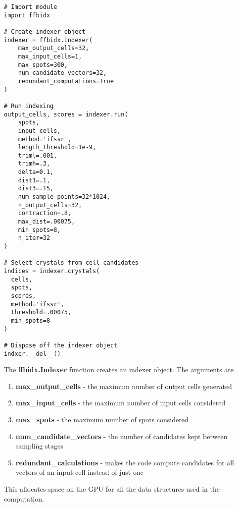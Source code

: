 \documentclass[a4paper,10pt]{article}
\begin{document}
\begin{lstlisting}
# Import module
import ffbidx

# Create indexer object
indexer = ffbidx.Indexer(
    max_output_cells=32,
    max_input_cells=1,
    max_spots=300,
    num_candidate_vectors=32,
    redundant_computations=True
)

# Run indexing
output_cells, scores = indexer.run(
    spots,
    input_cells,
    method='ifssr',
    length_threshold=1e-9,
    triml=.001,
    trimh=.3,
    delta=0.1,
    dist1=.1,
    dist3=.15,
    num_sample_points=32*1024,
    n_output_cells=32,
    contraction=.8,
    max_dist=.00075,
    min_spots=8,
    n_iter=32
)

# Select crystals from cell candidates
indices = indexer.crystals(
  cells,
  spots,
  scores,
  method='ifssr',
  threshold=.00075,
  min_spots=8
)

# Dispose off the indexer object
indxer.__del__()
\end{lstlisting}
%
The \textbf{ffbidx.Indexer} function creates an indexer object. The arguments are
%
\begin{enumerate}
 \item \textbf{max\_output\_cells} - the maximum number of output cells generated
 \item \textbf{max\_input\_cells} - the maximum number of input cells considered
 \item \textbf{max\_spots} - the maximum number of spots considered
 \item \textbf{num\_candidate\_vectors} - the number of candidates kept between sampling stages
 \item \textbf{redundant\_calculations} - makes the code compute candidates for all vectors of an input cell instead of just one
\end{enumerate}
%
This allocates space on the GPU for all the data structures used in the computation.
\end{document}
